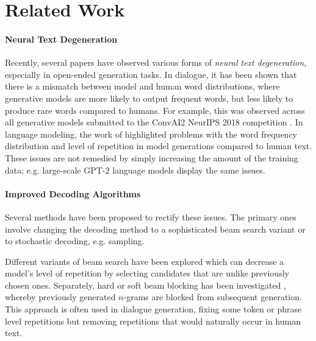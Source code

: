 \section{Related Work}  

\paragraph{Neural Text Degeneration}

Recently, several papers have observed various forms of \textit{neural text degeneration}, especially in open-ended generation tasks. In dialogue, it has been shown that there is a mismatch between model and human word distributions, where generative models are more likely to output frequent words, but less likely to produce rare words compared to humans. For example, this was observed across all generative models submitted to the ConvAI2 NeurIPS 2018 competition \citep{dinan2019second}. In language modeling, the work of \cite{holtzman2019curious} highlighted problems with the word frequency distribution and level of repetition in model generations compared to human text. These issues are not remedied by simply increasing the amount of the training data; e.g. large-scale GPT-2 language models \citep{radford2019language} display the same issues. 

\paragraph{Improved Decoding Algorithms}

Several methods have been proposed to rectify these issues. The primary ones involve changing the decoding method to a sophisticated beam search variant or to stochastic decoding, e.g. sampling.

Different variants of  beam search have been explored \citep{li2016simple,vijayakumar2018diverse,kulikov2018importance,holtzman2018learning} which can decrease a model's level of repetition by selecting candidates that are unlike previously chosen ones. Separately, hard or soft beam blocking has been investigated \citep{paulus2017deep,klein2017opennmt}, whereby previously generated $n$-grams are blocked from subsequent generation. This approach is often used in dialogue generation, fixing some token or phrase level repetitions but removing repetitions that would naturally occur in human text. 

